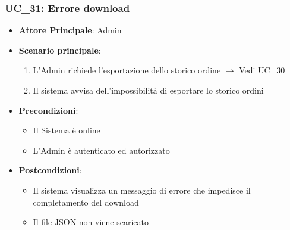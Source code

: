 \subsubsection{UC\_31: Errore download}
\label{uc_31}

\begin{itemize}
    \item \textbf{Attore Principale}: Admin
	 \item \textbf{Scenario principale}:
    \begin{enumerate}
        \item L'Admin richiede l'esportazione dello storico ordine $\rightarrow$ Vedi \hyperref[uc_30]{UC\_30}
		  \item Il sistema avvisa dell'impossibilità di esportare lo storico ordini
    \end{enumerate}
	\item \textbf{Precondizioni}:
	\begin{itemize}
		\item Il Sistema è online
		\item L'Admin è autenticato ed autorizzato
	\end{itemize}
	\item \textbf{Postcondizioni}:
	\begin{itemize}
		\item Il sistema visualizza un messaggio di errore che impedisce il completamento del download
		\item Il file JSON non viene scaricato
	\end{itemize}
\end{itemize}